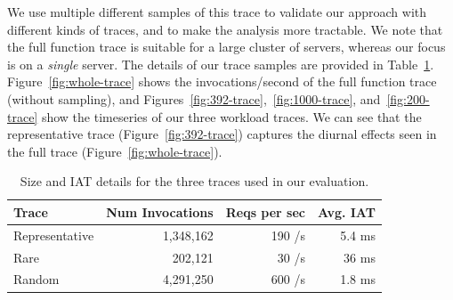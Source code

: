 
We use multiple different samples of this trace to validate our approach with different kinds of traces, and to make the analysis more tractable. We note that the full function trace is suitable for a large cluster of servers, whereas our focus is on a \emph{single} server.
The details of our trace samples are provided in Table~\ref{tab:trace-deets}. 
Figure~\ref{fig:whole-trace} shows the invocations/second of the full function trace (without sampling), and Figures~\ref{fig:392-trace},~\ref{fig:1000-trace}, and~\ref{fig:200-trace} show the timeseries of our three workload traces. 
We can see that the representative trace (Figure~\ref{fig:392-trace}) captures the diurnal effects seen in the full trace (Figure~\ref{fig:whole-trace}).



\begin{table}
  \begin{tabular}{lrrr}
    \hline 
    Trace & Num Invocations & Reqs per sec & Avg. IAT \\
    \hline
    Representative & 1,348,162 & 190 /s & 5.4 ms \\
    Rare & 202,121 & 30 /s & 36 ms \\
    Random & 4,291,250 & 600 /s & 1.8 ms \\
    \hline
  \end{tabular}
  \caption{Size and IAT details for the three traces used in our evaluation.}
  \label{tab:trace-deets}
\end{table}


